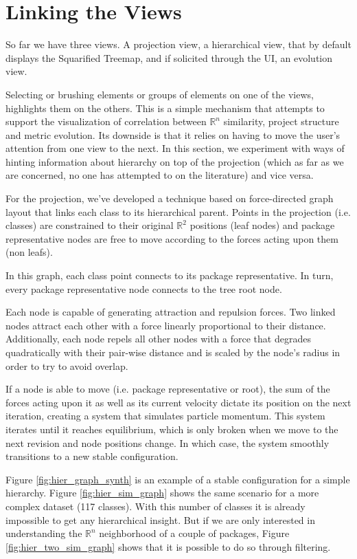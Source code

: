 \section{Linking the Views} \label{sec:linking}
So far we have three views. A projection view, a hierarchical view, that by default displays the Squarified Treemap, and if solicited through the UI, an evolution view.

Selecting or brushing elements or groups of elements on one of the views, highlights them on the others. This is a simple mechanism that attempts to support the visualization of correlation between $\mathbb{R}^{n}$ similarity, project structure and metric evolution. Its downside is that it relies on having to move the user's attention from one view to the next. In this section, we experiment with ways of hinting information about hierarchy on top of the projection (which as far as we are concerned, no one has attempted to on the literature) and vice versa.

For the projection, we've developed a technique based on force-directed graph layout that links each class to its hierarchical parent. Points in the projection (i.e. classes) are constrained to their original $\mathbb{R}^{2}$ positions (leaf nodes) and package representative nodes are free to move according to the forces acting upon them (non leafs).

In this graph, each class point connects to its package representative. In turn, every package representative node connects to the tree root node.

Each node is capable of generating attraction and repulsion forces. Two linked nodes attract each other with a force linearly proportional to their distance. Additionally, each node repels all other nodes with a force that degrades quadratically with their pair-wise distance and is scaled by the node's radius in order to try to avoid overlap.

If a node is able to move (i.e. package representative or root), the sum of the forces acting upon it as well as its current velocity dictate its position on the next iteration, creating a system that simulates particle momentum. This system iterates until it reaches equilibrium, which is only broken when we move to the next revision and node positions change. In which case, the system smoothly transitions to a new stable configuration.

Figure \ref{fig:hier_graph_synth} is an example of a stable configuration for a simple hierarchy. Figure \ref{fig:hier_sim_graph} shows the same scenario for a more complex dataset (117 classes). With this number of classes it is already impossible to get any hierarchical insight. But if we are only interested in understanding the $\mathbb{R}^{n}$ neighborhood of a couple of packages, Figure \ref{fig:hier_two_sim_graph} shows that it is possible to do so through filtering.

